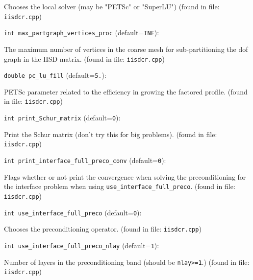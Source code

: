 Chooses the local solver (may be "PETSc" or "SuperLU")
 (found in file: \verb+iisdcr.cpp+)
\item\verb+int max_partgraph_vertices_proc+ {\rm(default=\verb|INF|)}:

The maximum number of vertices in the coarse mesh for
sub-partitioning the dof graph in the IISD matrix. 
 (found in file: \verb+iisdcr.cpp+)
\item\verb+double pc_lu_fill+ {\rm(default=\verb|5.|)}:

PETSc parameter related to the efficiency in growing
  the factored profile.
 (found in file: \verb+iisdcr.cpp+)
\item\verb+int print_Schur_matrix+ {\rm(default=\verb|0|)}:

Print the Schur matrix (don't try this for big problems).
 (found in file: \verb+iisdcr.cpp+)
\item\verb+int print_interface_full_preco_conv+ {\rm(default=\verb|0|)}:

Flags whether or not print the convergence when solving the
preconditioning for the interface problem when using
\verb+use_interface_full_preco+.
 (found in file: \verb+iisdcr.cpp+)
\item\verb+int use_interface_full_preco+ {\rm(default=\verb|0|)}:

Chooses the preconditioning operator. 
 (found in file: \verb+iisdcr.cpp+)
\item\verb+int use_interface_full_preco_nlay+ {\rm(default=\verb|1|)}:

Number of layers in the preconditioning band (should
 be \verb+nlay>=1+.) 
 (found in file: \verb+iisdcr.cpp+)
